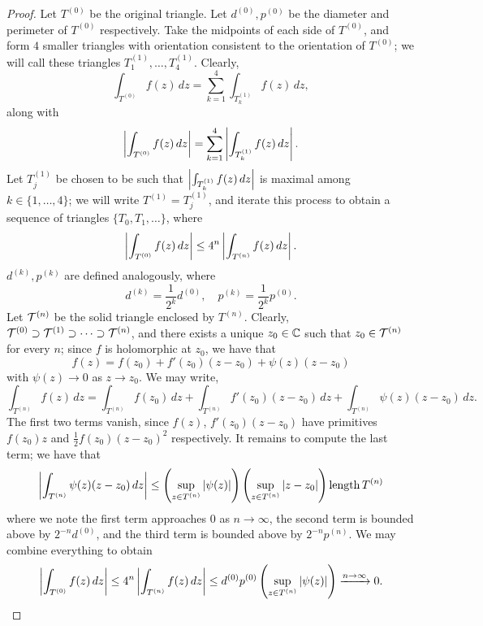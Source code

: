 \begin{proof}
    Let $T^{(0)}$ be the original triangle. Let $d^{(0)}, p^{(0)}$ be the diameter and perimeter of $T^{(0)}$ respectively. Take the midpoints of each side of $T^{(0)}$, and form $4$ smaller triangles with orientation consistent to the orientation of $T^{(0)}$; we will call these triangles $T_1^{(1)}, \dots, T_4^{(1)}$. Clearly,
    \[ \int_{T^{(0)}} f(z) \, dz = \sum_{k=1}^4 \int_{T_k^{(1)}} f(z) \, dz, \]
    along with
    \[ \left\lvert \int_{T^{(0)}} f(z) \, dz \right\rvert = \sum_{k=1}^4 \left\lvert \int_{T_k^{(1)}} f(z) \, dz \right\rvert. \]
    Let $T_j^{(1)}$ be chosen to be such that $\left\lvert \int_{T_k^{(1)}} f(z) \, dz \right\rvert$ is maximal among $k \in \{1, \dots, 4\}$; we will write $T^{(1)} = T_j^{(1)}$, and iterate this process to obtain a sequence of triangles $\{T_0, T_1, \dots\}$, where
    \[ \left\lvert \int_{T^{(0)}} f(z) \, dz \right\rvert \leq 4^n \left\lvert \int_{T^{(n)}} f(z) \, dz \right\rvert. \]
    $d^{(k)}, p^{(k)}$ are defined analogously, where
    \[ d^{(k)} = \frac{1}{2^k} d^{(0)}, \quad p^{(k)} = \frac{1}{2^k} p^{(0)}. \]
    Let $\mathcal T^{(n)}$ be the solid triangle enclosed by $T^{(n)}$. Clearly, $\mathcal T^{(0)} \supset \mathcal T^{(1)} \supset \dots \supset \mathcal T^{(n)}$, and there exists a unique $z_0 \in \mathbb C$ such that $z_0 \in \mathcal T^{(n)}$ for every $n$; since $f$ is holomorphic at $z_0$, we have that
    \[ f(z) = f(z_0) + f'(z_0)(z - z_0) + \psi(z)(z - z_0) \]
    with $\psi(z) \to 0$ as $z \to z_0$. We may write,
    \[ \int_{T^{(n)}} f(z) \, dz = \int_{T^{(n)}} f(z_0) \, dz + \int_{T^{(n)}} f'(z_0) (z - z_0) \, dz + \int_{T^{(n)}} \psi(z) (z - z_0) \, dz. \]
    The first two terms vanish, since $f(z)$, $f'(z_0)(z - z_0)$ have primitives $f(z_0) z$ and $\frac{1}{2} f(z_0) (z - z_0)^2$ respectively. It remains to compute the last term; we have that
    \[ \left\lvert \int_{T^{(n)}} \psi(z) (z - z_0) \, dz \right\rvert \leq \left(\sup_{z \in T^{(n)}} \left\lvert \psi(z) \right\rvert\right) \left(\sup_{z \in T^{(n)}} \left\lvert z - z_0 \right\rvert\right) \operatorname{length} T^{(n)} \]
    where we note the first term approaches $0$ as $n \to \infty$, the second term is bounded above by $2^{-n} d^{(0)}$, and the third term is bounded above by $2^{-n} p^{(n)}$. We may combine everything to obtain
    \[ \left\lvert \int_{T^{(0)}} f(z) \, dz \right\rvert \leq 4^n \left\lvert \int_{T^{(n)}} f(z) \, dz \right\rvert \leq d^{(0)} p^{(0)} \left(\sup_{z \in T^{(n)}} \left\lvert \psi(z) \right\rvert\right) \xrightarrow{n \to \infty} 0. \qedhere \]
\end{proof}